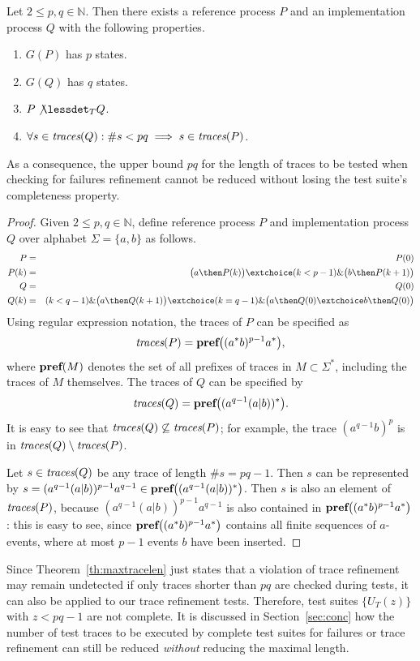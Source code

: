 \begin{theorem}\label{th:maxtracelen}
Let $2\le p,q \in\mathbb{N}$. Then there exists a reference process $P$ and an
implementation process $Q$ with the following properties.
\begin{enumerate}
\item $G(P)$ has $p$ states.
\item $G(Q)$ has $q$ states.
\item $P\not\lessdet_T Q$.
\item $\forall s\in\text{\it traces}(Q): \#s < pq\implies s\in\text{\it traces}(P)$.
\end{enumerate}
As a consequence, the upper bound $pq$ for the length of traces to be tested when checking for failures refinement cannot be reduced without losing the test suite's completeness property.
\end{theorem}
\begin{proof}
Given $2\le p,q \in\mathbb{N}$, define reference process $P$ and implementation process $Q$
over alphabet $\Sigma =\{ a,b\}$ as follows.
\begin{eqnarray*}
P & = &  P(0)
\\
P(k) & = & \big( a \then P(k) \big) \extchoice (k < p-1) \& \big( b \then P(k+1)\big)
\\
Q & = & Q(0)
\\
Q(k) & = & (k < q-1) \& \big( a \then Q(k+1)    \big) \extchoice
( k = q-1)\& \big( a\then Q(0) \extchoice b\then Q(0)  \big)
\end{eqnarray*}
Using regular expression notation, the traces of $P$ can be specified as
\[
\text{\it traces}(P) = \text{\bf pref}\big(  (a^*b)^{p-1}a^* \big),
\]
where $\text{\bf pref}(M)$ denotes the set of all prefixes of traces in $M\subset\Sigma^*$,
including the traces of $M$ themselves.
The traces of $Q$ can be specified by
\[
\text{\it traces}(Q) = \text{\bf pref}\big( (a^{q-1}(a|b))^*  \big).
\]
It is easy to see that $\text{\it traces}(Q)\not\subseteq\text{\it traces}(P)$; for example, the trace
$(a^{q-1}b)^p$ is in $\text{\it traces}(Q)\setminus\text{\it traces}(P)$.

Let $s \in\text{\it traces}(Q)$ be any trace of length $\#s = pq-1$. Then $s$ can be represented
by $s = (a^{q-1}(a|b))^{p-1}a^{q-1} \in \text{\bf pref}\big( (a^{q-1}(a|b))^*  \big)$.
Then $s$ is also an element of $\text{\it traces}(P)$, because $(a^{q-1}(a|b))^{p-1}a^{q-1}$
is also contained in $\text{\bf pref}\big(  (a^*b)^{p-1}a^* \big)$: this is easy to see, since
$\text{\bf pref}\big(  (a^*b)^{p-1}a^* \big)$ contains all finite sequences of $a$-events,
where at most $p-1$ events $b$ have been inserted.
\xbox
\end{proof}
%
Since Theorem~\ref{th:maxtracelen} just states that a violation of trace
refinement may remain undetected if only traces shorter than $pq$ are checked
during tests, it can also be applied to our trace refinement tests.
Therefore, test suites $\{ U_T(z) \}$ with $z<pq-1$ are not complete. It is
discussed in Section~\ref{sec:conc} how the number of test traces to be
executed by complete test suites for failures or trace refinement can still
be reduced {\it without} reducing the maximal length.

